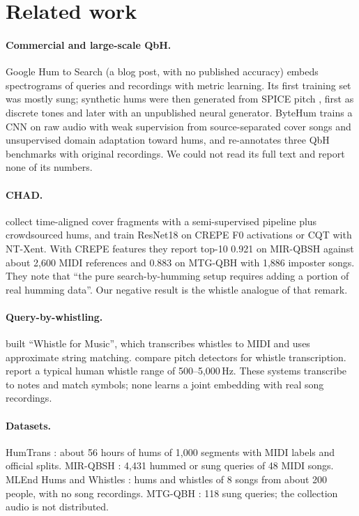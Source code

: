 \documentclass[11pt]{article}
\begin{document}
\section{Related work}

\paragraph{Commercial and large-scale QbH.} Google Hum to Search \citep{frank2020hum} (a blog post, with no published accuracy) embeds spectrograms of queries and recordings with metric learning. Its first training set was mostly sung; synthetic hums were then generated from SPICE pitch \citep{gfeller2020spice}, first as discrete tones and later with an unpublished neural generator. ByteHum \citep{du2024bytehum} trains a CNN on raw audio with weak supervision from source-separated cover songs and unsupervised domain adaptation toward hums, and re-annotates three QbH benchmarks with original recordings. We could not read its full text and report none of its numbers.

\paragraph{CHAD.} \citet{amatov2023chad} collect time-aligned cover fragments with a semi-supervised pipeline plus crowdsourced hums, and train ResNet18 on CREPE \citep{kim2018crepe} F0 activations or CQT with NT-Xent. With CREPE features they report top-10 0.921 on MIR-QBSH against about 2,600 MIDI references and 0.883 on MTG-QBH with 1,886 imposter songs. They note that ``the pure search-by-humming setup requires adding a portion of real humming data''. Our negative result is the whistle analogue of that remark.

\paragraph{Query-by-whistling.} \citet{shen2007whistle} built ``Whistle for Music'', which transcribes whistles to MIDI and uses approximate string matching. \citet{dias2008whistling} compare pitch detectors for whistle transcription. \citet{nilsson2008whistle} report a typical human whistle range of 500--5,000\,Hz. These systems transcribe to notes and match symbols; none learns a joint embedding with real song recordings.

\paragraph{Datasets.} HumTrans \citep{liu2024humtrans}: about 56 hours of hums of 1,000 segments with MIDI labels and official splits. MIR-QBSH \citep{jang2008progressive,mirqbsh}: 4,431 hummed or sung queries of 48 MIDI songs. MLEnd Hums and Whistles \citep{mlend}: hums and whistles of 8 songs from about 200 people, with no song recordings. MTG-QBH \citep{salamon2013tonal}: 118 sung queries; the collection audio is not distributed.
\end{document}

